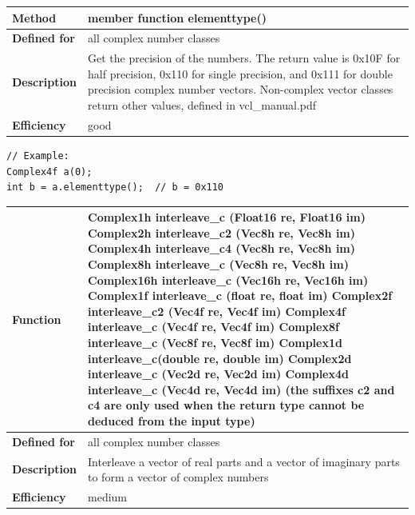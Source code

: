 \documentclass[11pt,a4paper,oneside,openright]{report}
\newcommand{\vspacesmall}{\vspace{3mm}}
\newcommand{\vspacebig}{\vspace{6mm}}
\begin{document}
\begin{tabular}{|p{25mm}|p{100mm}|}
\hline
\bfseries Method & member function elementtype() \\ \hline
\bfseries Defined for & all complex number classes
 \\ \hline
\bfseries Description & Get the precision of the numbers. \newline
The return value is 0x10F for half precision, 0x110 for single precision, and 0x111 for double precision complex number vectors.
Non-complex vector classes return other values, defined in vcl\_manual.pdf \\ \hline
\bfseries Efficiency & good \\ \hline
\end{tabular}
\vspacesmall

\begin{lstlisting}[frame=none]
// Example:
Complex4f a(0);
int b = a.elementtype();  // b = 0x110
\end{lstlisting}
\vspacebig

\begin{tabular}{|p{25mm}|p{100mm}|}
\hline
\bfseries Function & 
Complex1h interleave\_c (Float16 re, Float16 im) \newline
Complex2h interleave\_c2 (Vec8h re, Vec8h im) \newline
Complex4h interleave\_c4 (Vec8h re, Vec8h im) \newline
Complex8h interleave\_c (Vec8h re, Vec8h im) \newline
Complex16h interleave\_c (Vec16h re, Vec16h im) \newline
Complex1f interleave\_c (float re, float im) \newline
Complex2f interleave\_c2 (Vec4f re, Vec4f im) \newline
Complex4f interleave\_c (Vec4f re, Vec4f im) \newline
Complex8f interleave\_c (Vec8f re, Vec8f im) \newline
Complex1d interleave\_c(double re, double im) \newline
Complex2d interleave\_c (Vec2d re, Vec2d im) \newline
Complex4d interleave\_c (Vec4d re, Vec4d im) \newline
(the suffixes c2 and c4 are only used when the return type cannot be deduced from the input type) \\ \hline
\bfseries Defined for & all complex number classes \\ \hline
\bfseries Description & Interleave a vector of real parts and a vector of imaginary parts to form a vector of complex numbers \\ \hline
\bfseries Efficiency & medium  \\ \hline
\end{tabular}
\vspacesmall
\end{document}
